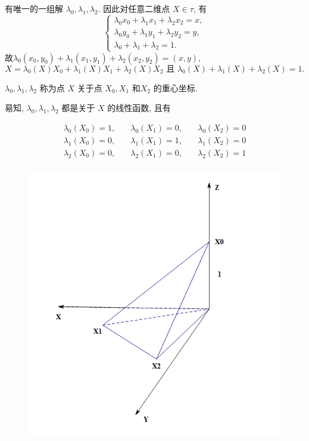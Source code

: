 \documentclass[12pt,a4paper]{article}
\begin{document}
有唯一的一组解 $\lambda_0,\lambda_1,\lambda_2$. 
因此对任意二维点 $X\in\tau$, 有
$$
\begin{cases}
\lambda _0 x_0+\lambda _1 x_1+\lambda _2 x_2=x,\\
\lambda _0 y_0+\lambda _1 y_1+\lambda _2 y_2=y,\\
\lambda _0+ \lambda _1 +\lambda _2 =1.
\end{cases}
$$
故$\lambda _0 (x_0,y_0)+\lambda _1 (x_1,y_1)+\lambda _2 (x_2,y_2)=(x,y)$,
$$
X=\lambda_0(X) X_0 + \lambda_1(X)X_1 + \lambda_2(X)X_2 
\text{ 且 } \lambda_0(X) + \lambda_1(X) + \lambda_2(X) = 1. 
$$

$\lambda_0,\lambda_1,\lambda_2$ 称为点 $X$ 关于点 $X_0,X_1$ 和$X_2$ 的重心坐标. 

易知, $\lambda_0, \lambda_1, \lambda_2$ 都是关于 $X$ 的线性函数, 且有

\begin{eqnarray*}
\lambda_0(X_0) = 1,\quad & \lambda_0(X_1) = 0,\quad& \lambda_0(X_2) = 0\\
\lambda_1(X_0) = 0,\quad & \lambda_1(X_1) = 1,\quad& \lambda_1(X_2) = 0\\
\lambda_2(X_0) = 0,\quad & \lambda_2(X_1) = 0,\quad & \lambda_2(X_2) = 1\\
\end{eqnarray*}

\begin{figure}[H]
\centering
\includegraphics[scale=0.7]{./figures/3.png}
\caption{}
\end{figure}
\end{document}
